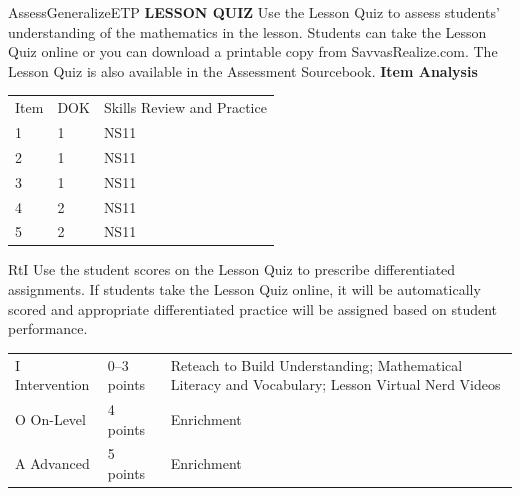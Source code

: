 \documentclass{article}
\newenvironment{te-addendum}[2]{}{}     %
\newcommand{\te}[1]{}                   %
\begin{document}
\begin{te-addendum}{Assess}{GeneralizeETP}
\textbf{LESSON QUIZ}
Use the Lesson Quiz to assess students' understanding of the mathematics in the lesson.
Students can take the Lesson Quiz online or you can download a printable copy from SavvasRealize.com. The Lesson Quiz is also available in the Assessment Sourcebook.
\textbf{Item Analysis}
\begin{tabular}{lll}
Item & DOK & Skills Review and Practice \\
1 & 1 & NS11 \\
2 & 1 & NS11 \\
3 & 1 & NS11 \\
4 & 2 & NS11 \\
5 & 2 & NS11 \\
\end{tabular}
RtI Use the student scores on the Lesson Quiz to prescribe differentiated assignments.
If students take the Lesson Quiz online, it will be automatically scored and appropriate differentiated practice will be assigned based on student performance.
\begin{tabular}{lll}
I Intervention & 0--3 points & Reteach to Build Understanding; Mathematical Literacy and Vocabulary; Lesson Virtual Nerd Videos \\
O On-Level & 4 points & Enrichment \\
A Advanced & 5 points & Enrichment \\
\end{tabular}
\te{SavvasRealize.com. Assessment. Lesson Quiz is available at SavvasRealize.com. ASSESSMENT RESOURCES.}
\end{te-addendum}
\end{document}
